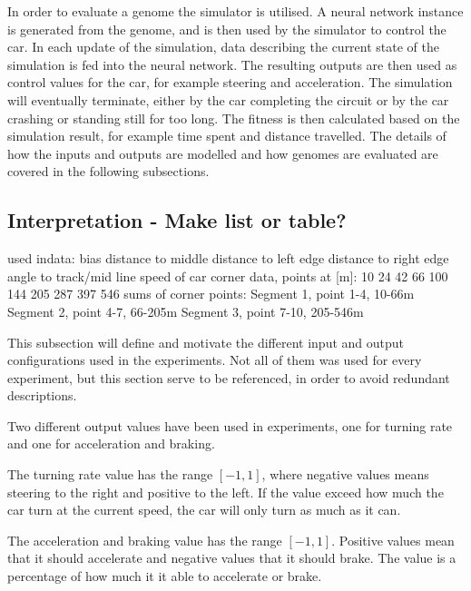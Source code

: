 In order to evaluate a genome the simulator is utilised. A neural network instance is generated from the genome, and is then used by the simulator to control the car. In each update of the simulation, data describing the current state of the simulation is fed into the neural network. The resulting outputs are then used as control values for the car, for example steering and acceleration. The simulation will eventually terminate, either by the car completing the circuit or by the car crashing or standing still for too long. The fitness is then calculated based on the simulation result, for example time spent and distance travelled. The details of how the inputs and outputs are modelled and how genomes are evaluated are covered in the following subsections. 


\subsection{Interpretation - Make list or table?}

used indata: 
bias
distance to middle
distance to left edge
distance to right edge
angle to track/mid line
speed of car 
corner data, points at [m]:
	10
	24
	42
	66
	100
	144
	205
	287
	397
	546
sums of corner points:
	Segment 1, point 1-4, 10-66m
	Segment 2, point 4-7, 66-205m
	Segment 3, point 7-10, 205-546m

This subsection will define and motivate the different input and output configurations used in the experiments. Not all of them was used for every experiment, but this section serve to be referenced, in order to avoid redundant descriptions.

Two different output values have been used in experiments, one for turning rate and one for acceleration and braking. 

The turning rate value has the range $[-1,1]$, where negative values means steering to the right and positive to the left. If the value exceed how much the car turn at the current speed, the car will only turn as much as it can.

The acceleration and braking value has the range $[-1, 1]$. Positive values mean that it should accelerate and negative values that it should brake. The value is a percentage of how much it it able to accelerate or brake.

